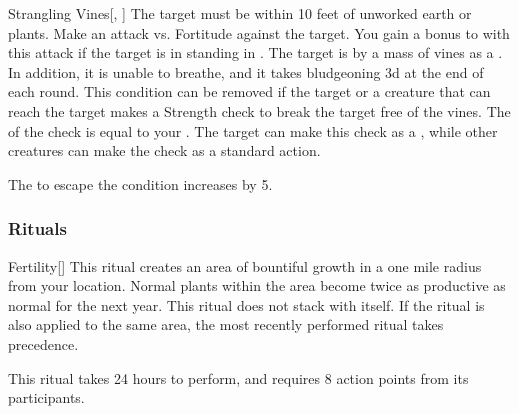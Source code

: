 \lowercase{\hypertarget{spell:Strangling Vines}{}}\label{spell:Strangling Vines}
\begin{freeability}[Rank 6]{\hypertarget{spell:Strangling Vines}{Strangling Vines}}[, ]
The target must be within 10 feet of unworked earth or plants.
Make an attack vs. Fortitude against the target.
You gain a  bonus to  with this attack if the target is in standing in .
\hit The target is  by a mass of vines as a .
In addition, it is unable to breathe, and it takes bludgeoning  \minus3d at the end of each round.
This condition can be removed if the target or a creature that can reach the target makes a Strength check to break the target free of the vines.
The  of the check is equal to your .
The target can make this check as a , while other creatures can make the check as a standard action.

\rankline
{} The  to escape the condition increases by 5.
\end{freeability}
\vspace{0.25em}



\subsubsection{Rituals}


\lowercase{\hypertarget{spell:Fertility}{}}\label{spell:Fertility}
\begin{apability}[Rank 3]{\hypertarget{spell:Fertility}{Fertility}}[]
\targetrule
This ritual creates an area of bountiful growth in a one mile radius  from your location.
Normal plants within the area become twice as productive as normal for the next year.
This ritual does not stack with itself.
If the  ritual is also applied to the same area, the most recently performed ritual takes precedence.

This ritual takes 24 hours to perform, and requires 8 action points from its participants.
\end{apability}
\vspace{0.25em}



